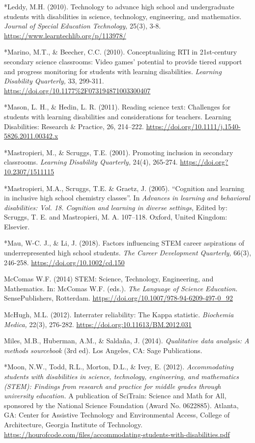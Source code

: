 \documentclass[11.5pt]{sig-alternate}
\begin{document}
*Leddy, M.H. (2010). Technology to advance high school and undergraduate students with disabilities in science, technology, engineering, and mathematics. \textit{Journal of Special Education Technology,} 25(3), 3-8. \url{https://www.learntechlib.org/p/113978/}

*Marino, M.T., \& Beecher, C.C. (2010). Conceptualizing RTI in 21st-century secondary science classrooms: Video games’ potential to provide tiered support and progress monitoring for students with learning disabilities. \textit{Learning Disability Quarterly,} 33, 299-311. \url{https://doi.org/10.1177\%2F073194871003300407}

*Mason, L. H., \& Hedin, L. R. (2011). Reading science text: Challenges for students with learning disabilities and considerations for teachers. Learning Disabilities: Research \& Practice, 26, 214–222. \url{https://doi.org/10.1111/j.1540-5826.2011.00342.x}

*Mastropieri, M., \& Scruggs, T.E. (2001). Promoting inclusion in secondary classrooms. \textit{Learning Disability Quarterly,} 24(4), 265-274. \url{https://doi.org?10.2307/1511115}

*Mastropieri, M.A., Scruggs, T.E. \& Graetz, J. (2005). “Cognition and learning in inclusive high school chemistry classes”. In \textit{Advances in learning and behavioral disabilities: Vol. 18. Cognition and learning in diverse settings,} Edited by: Scruggs, T. E. and Mastropieri, M. A. 107–118. Oxford, United Kingdom: Elsevier. 

*Mau, W-C. J., \& Li, J. (2018). Factors influencing STEM career aspirations of underrepresented high school students. \textit{The Career Development Quarterly,} 66(3), 246-258. \url{https://doi.org/10.1002/cd.150}

McComas W.F. (2014) STEM: Science, Technology, Engineering, and Mathematics. In: McComas W.F. (eds.). \textit{The Language of Science Education.} SensePublishers, Rotterdam. \url{https://doi.org/10.1007/978-94-6209-497-0\_92}

McHugh, M.L. (2012). Interrater reliability: The Kappa statistic. \textit{Biochemia Medica,} 22(3), 276-282. \url{https://doi.org:10.11613/BM.2012.031}

Miles, M.B., Huberman, A.M., \& Saldaña, J. (2014). \textit{Qualitative data analysis: A methods sourcebook} (3rd ed). Los Angeles, CA: Sage Publications.  

*Moon, N.W., Todd, R.L., Morton, D.L., \& Ivey, E. (2012). \textit{Accommodating students with disabilities in science, technology, engineering, and mathematics (STEM): Findings from research and practice for middle grades through university education.} A publication of SciTrain: Science and Math for All, sponsored by the National Science Foundation (Award No. 0622885). Atlanta, GA: Center for Assistive Technology and Environmental Access, College of Architecture, Georgia Institute of Technology. \url{https://hourofcode.com/files/accommodating-students-with-disabilities.pdf}
\end{document}
